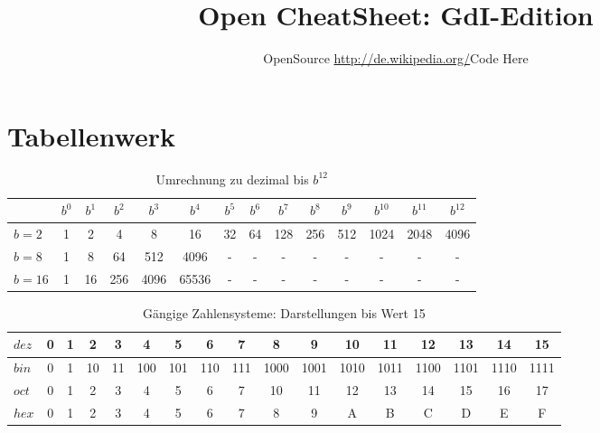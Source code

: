 \documentclass[a4paper]{article}
\title{Open CheatSheet: GdI-Edition}
\author{OpenSource \url{http://de.wikipedia.org/}Code Here}
\begin{document}
\maketitle

\section{Tabellenwerk}
\begin{table}[H]
\centering
\caption{Umrechnung zu dezimal bis $b^{12}$}
\label{gaengigeWerte}
\begin{tabular}{l|c|c|c|c|c|c|c|c|c|c|c|c|c}
         & $b^{0}$&$b^{1}$&$b^{2}$&$b^{3}$&$b^{4}$&$b^{5}$&$b^{6}$&$b^{7}$&$b^{8}$&$b^{9}$&$b^{10}$&$b^{11}$&$b^{12}$ \\ \hline\hline
$b = 2$  & 1      & 2     & 4     & 8     & 16    & 32    & 64    & 128   & 256   & 512   & 1024   & 2048   & 4096    \\
$b = 8$  & 1      & 8     & 64    & 512   & 4096  & -     & -     & -     & -     & -     & -      & -      & -       \\
$b = 16$ & 1      & 16    & 256   & 4096  & 65536 & -     & -     & -     & -     & -     & -      & -      & -       \\
\end{tabular}
\end{table}

\begin{table}[H]
\centering
\caption{Gängige Zahlensysteme: Darstellungen bis Wert 15}
\label{hexWerte}
\begin{tabular}{l|c|c|c|c|c|c|c|c|c|c|c|c|c|c|c|c}
$dez$ & 0 & 1 & 2  & 3  & 4   & 5   & 6     & 7     & 8    & 9    & 10   & 11   & 12   & 13   & 14   & 15   \\ \hline\hline
$bin$ & 0 & 1 & 10 & 11 & 100 & 101 & 110   & 111   & 1000 & 1001 & 1010 & 1011 & 1100 & 1101 & 1110 & 1111 \\
$oct$ & 0 & 1 & 2  & 3  & 4   & 5   & 6     & 7     & 10   & 11   & 12   & 13   & 14   & 15   & 16   & 17   \\
$hex$ & 0 & 1 & 2  & 3  & 4   & 5   & 6     & 7     & 8    & 9    & A    & B    & C    & D    & E    & F    \\
\end{tabular}
\end{table}
\end{document}
